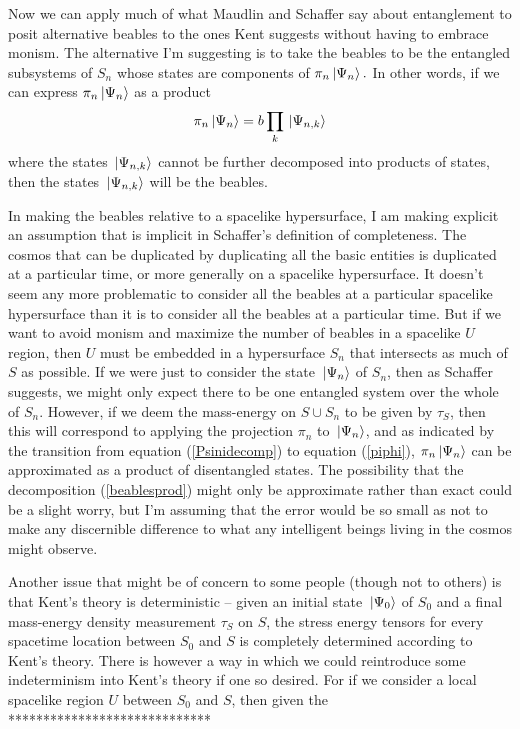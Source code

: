 Now we can apply much of what Maudlin and Schaffer say about entanglement to posit alternative beables to the ones Kent suggests without having to embrace monism. The alternative I'm suggesting is to take the beables to be the entangled subsystems of $S_n$ whose states are components of $\pi_n\ket*{\Psi_n}.$ In other words, if we can express $\pi_n\ket*{\Psi_n}$ as a product 
\begin{equation}\label{beablesprod}
\pi_n\ket*{\Psi_n}=b\prod_k \ket*{\Psi_{n,k}}
\end{equation}
where the states $\ket*{\Psi_{n,k}}$ cannot be further decomposed into products of states, then the states $\ket*{\Psi_{n,k}}$ will be the beables.

In making the beables relative to a spacelike hypersurface, I am making explicit an assumption that is implicit in Schaffer's definition of completeness. The cosmos that can be duplicated by duplicating all the basic entities is duplicated at a particular time, or more generally on a spacelike hypersurface. It doesn't seem any more problematic to consider all the beables at a particular spacelike hypersurface than it is to consider all the beables at a particular time. But if we want to avoid monism and maximize the number of beables in a spacelike $U$ region, then $U$ must be embedded in a hypersurface $S_n$ that intersects as much of $S$ as possible. If we were just to consider the state $\ket*{\Psi_n}$ of $S_n$, then as Schaffer suggests, we might only expect there to be one entangled system over the whole of $S_n$. However, if we deem the mass-energy on $S\cup S_n$ to be given by $\tau_S$, then this will correspond to applying the projection $\pi_n$ to $\ket*{\Psi_n}$, and as indicated by  the transition from equation (\ref{Psinidecomp}) to equation (\ref{piphi}), $\pi_n\ket*{\Psi_n}$ can be approximated as a product of disentangled states. The possibility that the decomposition (\ref{beablesprod}) might only be approximate rather than exact could be a slight worry, but I'm assuming that the error would be so small as not to make any discernible difference to what any intelligent beings living in the cosmos might observe. 

Another issue that might be of concern to some people (though not to others) is that Kent's theory is deterministic -- given an initial state $\ket*{\Psi_0}$ of $S_0$ and a final mass-energy density measurement $\tau_S$ on $S$, the stress energy tensors for every spacetime location between $S_0$ and $S$ is completely determined according to Kent's theory. There is however a way in which we could reintroduce some indeterminism into Kent's theory if one so desired.  For if we consider a local spacelike region $U$ between $S_0$ and $S$, then given the *****************************